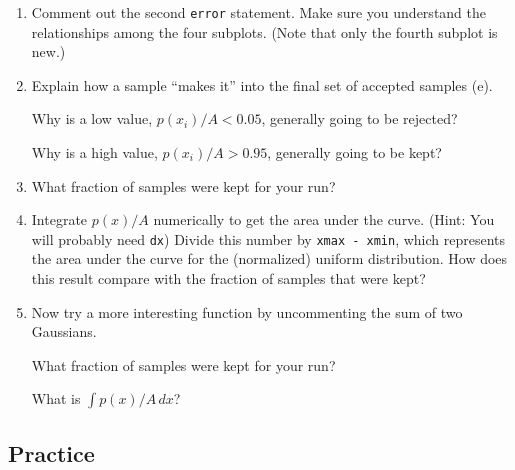 \documentclass[11pt,titlepage,fleqn]{article}
\begin{document}
\begin{enumerate}
\vertgap

\item Comment out the second \verb+error+ statement. Make sure you understand the relationships among the four subplots. (Note that only the fourth subplot is new.)

\vertgap

\item Explain how a sample ``makes it'' into the final set of accepted samples (e).

Why is a low value, $p(x_i)/A < 0.05$, generally going to be rejected?

Why is a high value, $p(x_i)/A > 0.95$, generally going to be kept?

\vertgap

\item What fraction of samples were kept for your run?

\vertgap

\item Integrate $p(x)/A$ numerically to get the area under the curve. (Hint: You will probably need \verb+dx+) Divide this number by \verb+xmax - xmin+, which represents the area under the curve for the (normalized) uniform distribution. How does this result compare with the fraction of samples that were kept?

\vertgap

\item Now try a more interesting function by uncommenting the sum of two Gaussians.

What fraction of samples were kept for your run?

What is $\int p(x)/A \, dx$?

\end{enumerate}


\subsection*{Practice}
\end{document}
